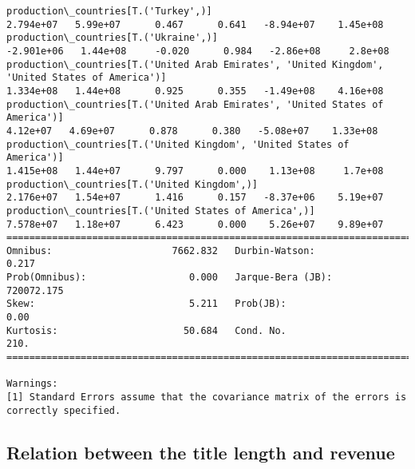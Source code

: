 \documentclass[11pt]{article}
\begin{document}
\begin{Verbatim}[commandchars=\\\{\}]
production\_countries[T.('Turkey',)]                                                                                                                                                    2.794e+07   5.99e+07      0.467      0.641   -8.94e+07    1.45e+08
production\_countries[T.('Ukraine',)]                                                                                                                                                  -2.901e+06   1.44e+08     -0.020      0.984   -2.86e+08     2.8e+08
production\_countries[T.('United Arab Emirates', 'United Kingdom', 'United States of America')]                                                                                         1.334e+08   1.44e+08      0.925      0.355   -1.49e+08    4.16e+08
production\_countries[T.('United Arab Emirates', 'United States of America')]                                                                                                            4.12e+07   4.69e+07      0.878      0.380   -5.08e+07    1.33e+08
production\_countries[T.('United Kingdom', 'United States of America')]                                                                                                                 1.415e+08   1.44e+07      9.797      0.000    1.13e+08     1.7e+08
production\_countries[T.('United Kingdom',)]                                                                                                                                            2.176e+07   1.54e+07      1.416      0.157   -8.37e+06    5.19e+07
production\_countries[T.('United States of America',)]                                                                                                                                  7.578e+07   1.18e+07      6.423      0.000    5.26e+07    9.89e+07
==============================================================================
Omnibus:                     7662.832   Durbin-Watson:                   0.217
Prob(Omnibus):                  0.000   Jarque-Bera (JB):           720072.175
Skew:                           5.211   Prob(JB):                         0.00
Kurtosis:                      50.684   Cond. No.                         210.
==============================================================================

Warnings:
[1] Standard Errors assume that the covariance matrix of the errors is correctly specified.

    \end{Verbatim}

    \subsection{Relation between the title length and
revenue}\label{relation-between-the-title-length-and-revenue}
\end{document}
